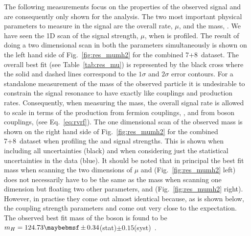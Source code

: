 The following measurements focus on the properties of the observed signal and are consequently only shown for the \MFM analysis. The two most important physical parameters to measure in the signal are the overall rate, $\mu$, and the mass, \mH. We have seen the 1D \NLL scan of the signal strength, $\mu$, when \mH is profiled. The result of doing a two dimensional \NLL scan in both the parameters simultaneously is shown on the left hand side of Fig.~\ref{fig:res_mumh2} for the combined 7+8~\TeV dataset. The overall best fit (see Table~\ref{tab:res_mu}) is represented by the black cross where the solid and dashed lines correspond to the $1\sigma$ and $2\sigma$ error contours. For a standalone measurement of the mass of the observed particle it is undesirable to constrain the signal resonance to have exactly \SM like couplings and production rates. Consequently, when measuring the mass, the overall signal rate is allowed to scale in terms of the production from fermion couplings, \RF, and from boson couplings, \RV (see Eq.~\ref{eq:rvrf}). The one dimensional \NLL scan of the observed mass is shown on the right hand side of Fig.~\ref{fig:res_mumh2} for the combined 7+8~\TeV dataset when profiling the \RV and \RF signal strengths. This is shown when including all uncertainties (black) and when considering just the statistical uncertainties in the data (blue). It should be noted that in principal the best fit mass when scanning the two dimensions of $\mu$ and \mH (Fig.~\ref{fig:res_mumh2} left) does not necessarily have to be the same as the mass when scanning one dimension \mH but floating two other parameters, \RV and \RF (Fig.~\ref{fig:res_mumh2} right). However, in practise they come out almost identical because, as is shown below, the coupling strength parameters \RV and \RF come out very close to the \SM expectation. The observed best fit mass of the boson is found to be $\mH=124.73\pm0.34$(stat)$\pm0.15$(syst)~\GeV. 

